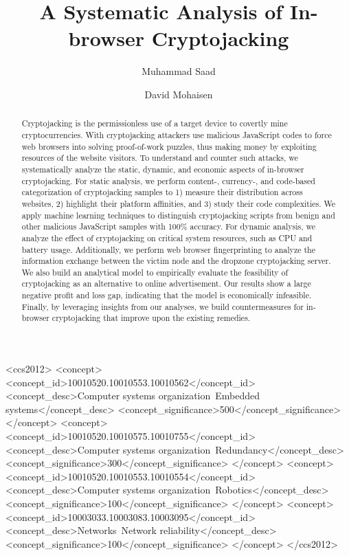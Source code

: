 \documentclass[acmlarge]{acmart}
\begin{document}
\title{A Systematic Analysis of In-browser Cryptojacking}

\author{Muhammad Saad}
\author{David Mohaisen}

\begin{abstract}
Cryptojacking is the permissionless use of a target device to covertly mine cryptocurrencies. With cryptojacking attackers use malicious JavaScript codes to force web browsers into solving proof-of-work puzzles, thus making money by exploiting resources of the website visitors. To understand and counter such attacks, we systematically analyze the static, dynamic, and economic aspects of in-browser cryptojacking. For static analysis, we perform content-, currency-, and code-based categorization of cryptojacking samples to 1) measure their distribution across websites, 2) highlight their platform affinities, and 3) study their code complexities. We apply machine learning techniques to distinguish cryptojacking scripts from benign and other malicious JavaScript samples with 100\% accuracy. For dynamic analysis, we analyze the effect of cryptojacking on critical system resources, such as CPU and battery usage. Additionally, we perform web browser fingerprinting to analyze the information exchange between the victim node and the dropzone cryptojacking server. We also build an analytical model to empirically evaluate the feasibility of cryptojacking as an alternative to online advertisement. Our results show a large negative profit and loss gap, indicating that the model is economically infeasible. Finally, by leveraging insights from our analyses, we build countermeasures for in-browser cryptojacking that improve upon the existing remedies.  

\end{abstract}


\begin{CCSXML}
<ccs2012>
 <concept>
  <concept_id>10010520.10010553.10010562</concept_id>
  <concept_desc>Computer systems organization~Embedded systems</concept_desc>
  <concept_significance>500</concept_significance>
 </concept>
 <concept>
  <concept_id>10010520.10010575.10010755</concept_id>
  <concept_desc>Computer systems organization~Redundancy</concept_desc>
  <concept_significance>300</concept_significance>
 </concept>
 <concept>
  <concept_id>10010520.10010553.10010554</concept_id>
  <concept_desc>Computer systems organization~Robotics</concept_desc>
  <concept_significance>100</concept_significance>
 </concept>
 <concept>
  <concept_id>10003033.10003083.10003095</concept_id>
  <concept_desc>Networks~Network reliability</concept_desc>
  <concept_significance>100</concept_significance>
 </concept>
</ccs2012>
\end{CCSXML}
\end{document}
